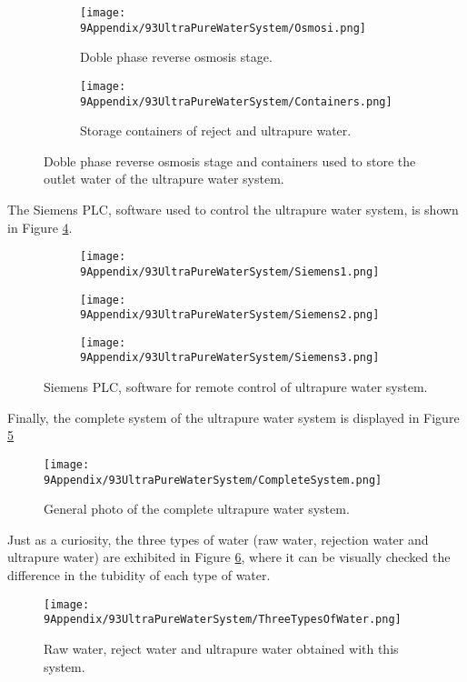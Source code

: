 \begin{figure}
\centering
    \begin{subfigure}[b]{0.3\textwidth}
    \centering
    \texttt{[image: 9Appendix/93UltraPureWaterSystem/Osmosi.png]}  
    \caption{Doble phase reverse osmosis stage.\label{subfig:Osmosi}}
    \end{subfigure}
    \hfill
    \begin{subfigure}[b]{0.5\textwidth}
    \centering
    \texttt{[image: 9Appendix/93UltraPureWaterSystem/Containers.png]}  
    \caption{Storage containers of reject and ultrapure water.\label{subfig:Containers}}
    \end{subfigure}
 \caption{Doble phase reverse osmosis stage and containers used to store the outlet water of the ultrapure water system.}
 \label{subfig:OsmosisContainers}
\end{figure}

The Siemens PLC, software used to control the ultrapure water system, is shown in Figure \ref{fig:Siemens}.

\begin{figure}
\centering
    \begin{subfigure}[b]{0.37\textwidth}
    \centering
    \texttt{[image: 9Appendix/93UltraPureWaterSystem/Siemens1.png]}  
    \caption{}
    \end{subfigure}
    \hfill
    \begin{subfigure}[b]{0.3\textwidth}
    \centering
    \texttt{[image: 9Appendix/93UltraPureWaterSystem/Siemens2.png]}  
    \caption{}
    \end{subfigure}
    \hfill
    \begin{subfigure}[b]{0.27\textwidth}
    \centering
    \texttt{[image: 9Appendix/93UltraPureWaterSystem/Siemens3.png]}  
    \caption{}
    \end{subfigure}
 \caption{Siemens PLC, software for remote control of ultrapure water system.}
 \label{fig:Siemens}
\end{figure}

Finally, the complete system of the ultrapure water system is displayed in Figure \ref{fig:CompleteSystem}

\begin{figure}[htbp]
\centering
\texttt{[image: 9Appendix/93UltraPureWaterSystem/CompleteSystem.png]}
\caption{General photo of the complete ultrapure water system.\label{fig:CompleteSystem}}
\end{figure}

Just as a curiosity, the three types of water (raw water, rejection water and ultrapure water) are exhibited in Figure \ref{fig:ThreeTypesOfWater}, where it can be visually checked the difference in the tubidity of each type of water.

\begin{figure}[htbp]
\centering
\texttt{[image: 9Appendix/93UltraPureWaterSystem/ThreeTypesOfWater.png]}
\caption{Raw water, reject water and ultrapure water obtained with this system.\label{fig:ThreeTypesOfWater}}
\end{figure}
